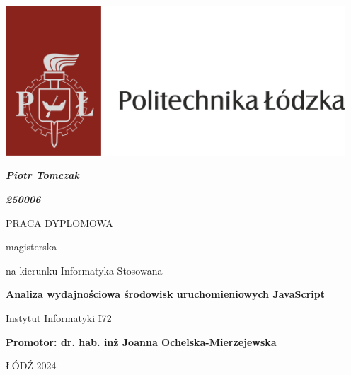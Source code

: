 \thispagestyle{empty}

\includegraphics[width=5in]{LogoPL.png}

\begin{centering}

\vspace{1cm}

\textbf{\textit{\large{Piotr Tomczak}}}

\vspace{.1cm}

\textbf{\textit{\large{250006}}}

\vspace{1.5cm}

{\large{PRACA DYPLOMOWA}}

\vspace{.1cm}

{\large{magisterska}}

\vspace{.1cm}
na kierunku Informatyka Stosowana
\vspace{1.8cm}

\textbf{\Large{Analiza wydajnościowa środowisk uruchomieniowych JavaScript}}

\end{centering}

\vspace{3.0cm}
\begin{centering}
{Instytut Informatyki I72}\\
\end{centering}
\vspace{1.0cm}
\textbf{Promotor: dr. hab. inż Joanna Ochelska-Mierzejewska}

\vfill
\begin{centering}
ŁÓDŹ 2024\\
\end{centering}
